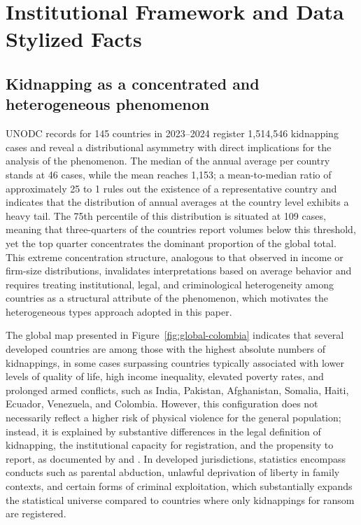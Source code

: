\documentclass[ecta,nameyear,draft]{econsocart}
\theoremstyle{plain}
\theoremstyle{definition}
\newcommand{\1}{\mathbf{1}}
\begin{document}
\section{Institutional Framework and Data Stylized Facts}\label{sec:institutional}


\subsection{Kidnapping as a concentrated and heterogeneous phenomenon}

UNODC records \citet{unodc_Data} for 145 countries in 2023--2024 register 1,514,546 kidnapping cases and reveal a distributional asymmetry with direct implications for the analysis of the phenomenon. The median of the annual average per country stands at 46 cases, while the mean reaches 1,153; a mean-to-median ratio of approximately 25 to 1 rules out the existence of a representative country and indicates that the distribution of annual averages at the country level exhibits a heavy tail. The 75th percentile of this distribution is situated at 109 cases, meaning that three-quarters of the countries report volumes below this threshold, yet the top quarter concentrates the dominant proportion of the global total. This extreme concentration structure, analogous to that observed in income or firm-size distributions, invalidates interpretations based on average behavior and requires treating institutional, legal, and criminological heterogeneity among countries as a structural attribute of the phenomenon, which motivates the heterogeneous types approach adopted in this paper.

The global map presented in Figure~\ref{fig:global-colombia} indicates that several developed countries are among those with the highest absolute numbers of kidnappings, in some cases surpassing countries typically associated with lower levels of quality of life, high income inequality, elevated poverty rates, and prolonged armed conflicts, such as India, Pakistan, Afghanistan, Somalia, Haiti, Ecuador, Venezuela, and Colombia. However, this configuration does not necessarily reflect a higher risk of physical violence for the general population; instead, it is explained by substantive differences in the legal definition of kidnapping, the institutional capacity for registration, and the propensity to report, as documented by \citet{UNODC2006Manual} and \citet{UNODC2016ICCS}. In developed jurisdictions, statistics encompass conducts such as parental abduction, unlawful deprivation of liberty in family contexts, and certain forms of criminal exploitation, which substantially expands the statistical universe compared to countries where only kidnappings for ransom are registered.
\end{document}
